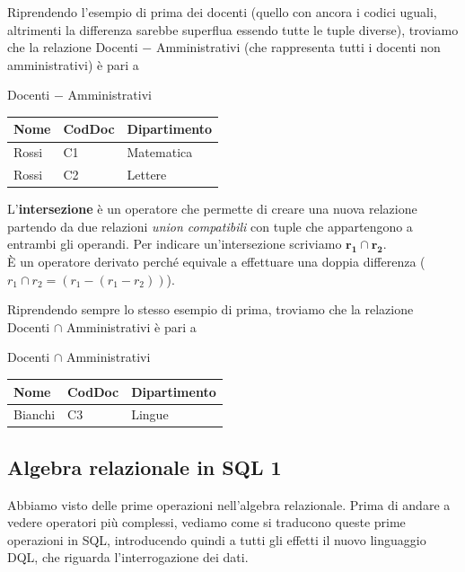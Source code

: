 \documentclass[11pt, a4paper, titlepage, oneside]{scrbook}
\begin{document}
Riprendendo l'esempio di prima dei docenti (quello con ancora i codici uguali, altrimenti la differenza sarebbe superflua essendo tutte le tuple diverse), troviamo che la relazione Docenti $-$ Amministrativi (che rappresenta tutti i docenti non amministrativi) è pari a

\begin{center}
    Docenti $-$ Amministrativi

\begin{tabular}{|l|l|l|}
\hline
\textbf{Nome} & \textbf{CodDoc} & \textbf{Dipartimento} \\ \hline
Rossi & C1 & Matematica \\
Rossi & C2 & Lettere \\ \hline
\end{tabular}
\end{center}

\begin{Definizione}[Intersezione]
\label{def-intersezione}
L'\textbf{intersezione} è un operatore che permette di creare una nuova relazione partendo da due relazioni \textit{union compatibili} con tuple che appartengono a entrambi gli operandi. Per indicare un'intersezione scriviamo $\bm{r_1 \cap r_2}$. \\
È un operatore derivato perché equivale a effettuare una doppia differenza ($r_1 \cap r_2 = (r_1 - (r_1 - r_2))$).
\end{Definizione}

Riprendendo sempre lo stesso esempio di prima, troviamo che la relazione Docenti $\cap$ Amministrativi è pari a 

\begin{center}
    Docenti $\cap$ Amministrativi

\begin{tabular}{|l|l|l|}
\hline
\textbf{Nome} & \textbf{CodDoc} & \textbf{Dipartimento} \\ \hline
Bianchi & C3 & Lingue \\ \hline
\end{tabular}
\end{center}

\subsection{Algebra relazionale in SQL 1}

Abbiamo visto delle prime operazioni nell'algebra relazionale. Prima di andare a vedere operatori più complessi, vediamo come si traducono queste prime operazioni in SQL, introducendo quindi a tutti gli effetti il nuovo linguaggio DQL, che riguarda l'interrogazione dei dati.
\end{document}
